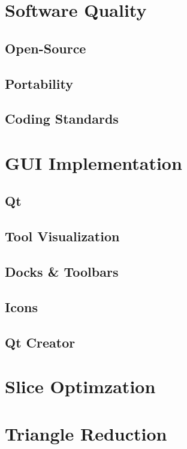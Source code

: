 \documentclass{report}
\begin{document}
\begin{appendices}
\chapter{Software Quality}
\section{Open-Source}
\section{Portability}
\section{Coding Standards}

\chapter{GUI Implementation}
\section{Qt}
\section{Tool Visualization}
\section{Docks \& Toolbars}
\section{Icons}
\section{Qt Creator}

\chapter{Slice Optimzation}
\chapter{Triangle Reduction}

\end{appendices}
\end{document}
